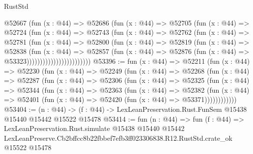 \begin{lexlean}{RustStd}
\begin{coremodule}
                          @52667
                            (fun (x : @44) =>
                            @52686
                              (fun (x : @44) =>
                              @52705
                                (fun (x : @44) =>
                                @52724
                                  (fun (x : @44) =>
                                  @52743
                                    (fun (x : @44) =>
                                    @52762
                                      (fun (x : @44) =>
                                      @52781
                                        (fun (x : @44) =>
                                        @52800
                                          (fun (x : @44) =>
                                          @52819
                                            (fun (x : @44) =>
                                            @52838
                                              (fun (x : @44) =>
                                              @52857
                                                (fun (x : @44) =>
                                                @52876
                                                  (fun (x : @44) => @53323))))))))))))))))))))))))
@53396 := fun (x : @44) =>
  @52211
    (fun (x : @44) =>
    @52230
      (fun (x : @44) =>
      @52249
        (fun (x : @44) =>
        @52268
          (fun (x : @44) =>
          @52287
            (fun (x : @44) =>
            @52306
              (fun (x : @44) =>
              @52325
                (fun (x : @44) =>
                @52344
                  (fun (x : @44) =>
                  @52363
                    (fun (x : @44) =>
                    @52382
                      (fun (x : @44) =>
                      @52401 (fun (x : @44) => @52420 (fun (x : @44) => @53371))))))))))))
@53404 := (n : @44) ->
  (f : @44) -> LexLeanPreservation.Rust.FunSem @15438 @15440 @15442 @15522 @15478
@53414 := fun (n : @44) =>
  fun (f : @44) =>
  LexLeanPreservation.Rust.simulate
    @15438
    @15440
    @15442
    LexLeanPreserve.Cb2bffcc8b22fbbef7efb3ff023306838.R12.RustStd.crate_ok
    @15522
    @15478
\end{coremodule}
\end{lexlean}

